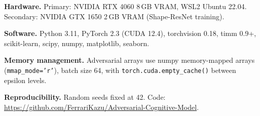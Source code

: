 \documentclass[12pt,a4paper]{article}
\begin{document}
\textbf{Hardware.}
Primary: NVIDIA RTX 4060 8\,GB VRAM, WSL2 Ubuntu 22.04.
Secondary: NVIDIA GTX 1650 2\,GB VRAM (Shape-ResNet training).

\textbf{Software.}
Python 3.11, PyTorch 2.3 (CUDA 12.4), torchvision 0.18,
timm 0.9+, scikit-learn, scipy, numpy, matplotlib, seaborn.

\textbf{Memory management.}
Adversarial arrays use numpy memory-mapped arrays
(\texttt{mmap\_mode='r'}), batch size 64,
with \texttt{torch.cuda.empty\_cache()} between epsilon levels.

\textbf{Reproducibility.}
Random seeds fixed at 42. Code:
\url{https://github.com/FerrariKazu/Adversarial-Cognitive-Model}.
\end{document}
